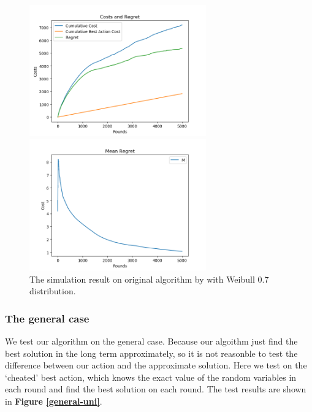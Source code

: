 \documentclass{article}
\theoremstyle{plain}
\theoremstyle{definition}
\theoremstyle{remark}
\begin{document}
    \begin{figure}[htbp!]
        \begin{minipage}[h]{0.5\linewidth}
            \centering
            \includegraphics[width=3in]{simple-cost-regret-weibull07.png}
        \end{minipage}
        \begin{minipage}[h]{0.5\linewidth}
            \centering
            \includegraphics[width=3in]{simple-mean-regret-weibull07.png}
        \end{minipage}
        \caption{The simulation result on original algorithm by \citet{pmlr-v28-chen13a} with Weibull $0.7$ distribution.}
        \label{center-weibull07-ori}
    \end{figure}

    \subsubsection{The general case}

    We test our algorithm on the general case. Because our algoithm just find the best solution in the long term approximately, so it is not reasonble to test the difference between our action and the approximate solution. Here we test on the `cheated' best action, which knows the exact value of the random variables in each round and find the best solution on each round. The test results are shown in \textbf{Figure \ref{general-uni}}.
\end{document}
